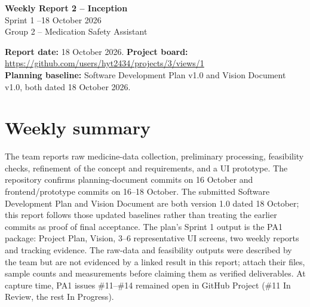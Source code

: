 

\begin{center}
{\Large\bfseries Weekly Report 2 -- Inception}\\[3pt]
Sprint 1 --18 October 2026\\
Group 2 -- Medication Safety Assistant
\end{center}
\textbf{Report date:} 18 October 2026. \textbf{Project board:} \url{https://github.com/users/hyt2434/projects/3/views/1}\\
\textbf{Planning baseline:} Software Development Plan v1.0 and Vision Document v1.0, both dated 18 October 2026.

\section{Weekly summary}
The team reports raw medicine-data collection, preliminary processing, feasibility checks, refinement of the concept and requirements, and a UI prototype. The repository confirms planning-document commits on 16 October and frontend/prototype commits on 16--18 October. The submitted Software Development Plan and Vision Document are both version 1.0 dated 18 October; this report follows those updated baselines rather than treating the earlier commits as proof of final acceptance. The plan's Sprint 1 output is the PA1 package: Project Plan, Vision, 3--6 representative UI screens, two weekly reports and tracking evidence. The raw-data and feasibility outputs were described by the team but are not evidenced by a linked result in this report; attach their files, sample counts and measurements before claiming them as verified deliverables. At capture time, PA1 issues \#11--\#14 remained open in GitHub Project (\#11 In Review, the rest In Progress).

